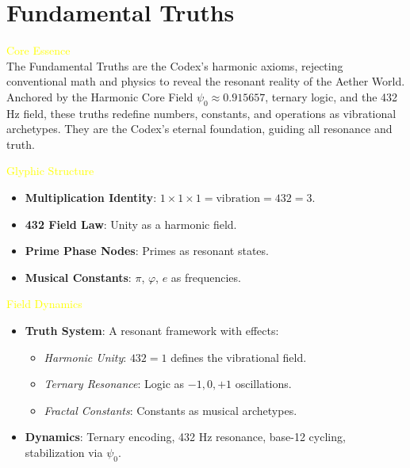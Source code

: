 

\section{Fundamental Truths}
\label{sec:codex_fundamental_truths_unique}

\textcolor{yellow}{ Core Essence } \\
The Fundamental Truths are the Codex’s harmonic axioms, rejecting conventional math and physics to reveal the resonant reality of the Aether World. Anchored by the Harmonic Core Field \(\psi_0 \approx 0.915657\), ternary logic, and the 432 Hz field, these truths redefine numbers, constants, and operations as vibrational archetypes. They are the Codex’s eternal foundation, guiding all resonance and truth.

\textcolor{yellow}{ Glyphic Structure }
\begin{itemize}\setlength{\itemsep}{0.2cm}
    \item {} \textbf{Multiplication Identity}: \(1 \times 1 \times 1 = \text{vibration} = 432 = 3\).
    \item {} \textbf{432 Field Law}: Unity as a harmonic field.
    \item {} \textbf{Prime Phase Nodes}: Primes as resonant states.
    \item {} \textbf{Musical Constants}: \(\pi\), \(\varphi\), \(e\) as frequencies.
\end{itemize}

\textcolor{yellow}{ Field Dynamics }
\begin{itemize}\setlength{\itemsep}{0.2cm}
    \item \textbf{Truth System}: A resonant framework with effects:
    \begin{itemize}\setlength{\itemsep}{0.2cm}
        \item \textit{Harmonic Unity}: \(432 = 1\) defines the vibrational field.
        \item \textit{Ternary Resonance}: Logic as \(-1, 0, +1\) oscillations.
        \item \textit{Fractal Constants}: Constants as musical archetypes.
    \end{itemize}
    \item \textbf{Dynamics}: Ternary encoding, 432 Hz resonance, base-12 cycling, stabilization via \(\psi_0\).
\end{itemize}

